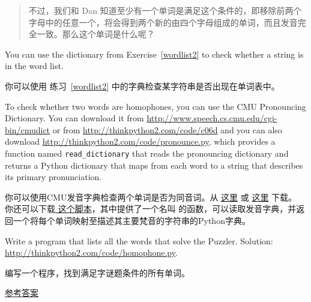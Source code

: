 \begin{exercise}
\begin{quote}
不过，我们和 Dan 知道至少有一个单词是满足这个条件的，即移除前两个字母中的任意一个，将会得到两个新的由四个字母组成的单词，而且发音完全一致。那么这个单词是什么呢？

\end{quote}

  

You can use the dictionary from Exercise~\ref{wordlist2} to check
whether a string is in the word list.

你可以使用 练习~\ref{wordlist2} 中的字典检查某字符串是否出现在单词表中。

To check whether two words are homophones, you can use the CMU
Pronouncing Dictionary.  You can download it from
\url{http://www.speech.cs.cmu.edu/cgi-bin/cmudict} or from
\url{http://thinkpython2.com/code/c06d} and you can also download
\url{http://thinkpython2.com/code/pronounce.py}, which provides a function
named \verb"read_dictionary" that reads the pronouncing dictionary and
returns a Python dictionary that maps from each word to a string that
describes its primary pronunciation.

你可以使用CMU发音字典检查两个单词是否为同音词。从 \href{http://www.speech.cs.cmu.edu/cgi-bin/cmudict}{这里} 或 \href{http://thinkpython2.com/code/c06d}{这里} 下载。 你还可以下载\href{http://thinkpython2.com/code/pronounce.py}{ 这个脚本}，其中提供了一个名叫  的函数，可以读取发音字典，并返回一个将每个单词映射至描述其主要梵音的字符串的Python字典。

Write a program that lists all the words that solve the Puzzler.
Solution: \url{http://thinkpython2.com/code/homophone.py}.

编写一个程序，找到满足字谜题条件的所有单词。

\href{http://thinkpython2.com/code/homophone.py}{参考答案}

\end{exercise}
